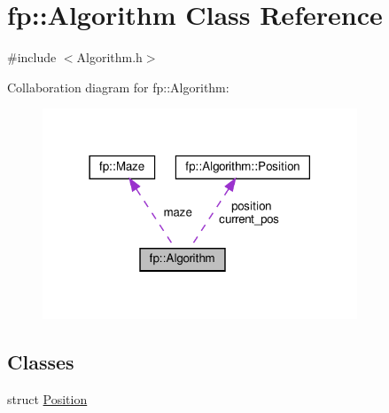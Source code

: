 \hypertarget{classfp_1_1_algorithm}{}\section{fp\+:\+:Algorithm Class Reference}
\label{classfp_1_1_algorithm}


{\ttfamily \#include $<$Algorithm.\+h$>$}



Collaboration diagram for fp\+:\+:Algorithm\+:\nopagebreak
\begin{figure}[H]
\begin{center}
\leavevmode
\includegraphics[width=266pt]{classfp_1_1_algorithm__coll__graph}
\end{center}
\end{figure}
\subsection*{Classes}
\begin{DoxyCompactItemize}
\item 
struct \hyperlink{structfp_1_1_algorithm_1_1_position}{Position}
\end{DoxyCompactItemize}
